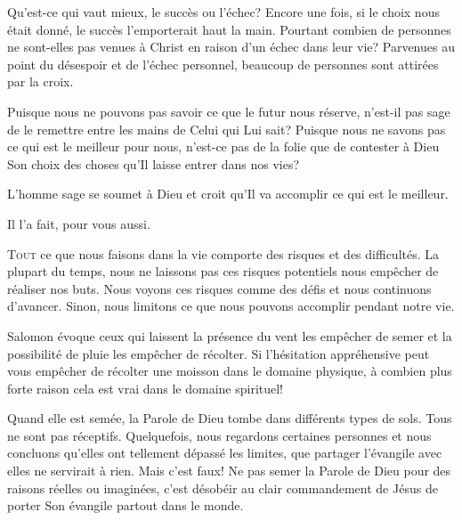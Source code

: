 Qu'est-ce qui vaut mieux, le succès ou l'échec?
 Encore une fois, si le choix nous était donné,
 le succès l'emporterait haut la main.
 Pourtant combien de personnes ne sont-elles pas venues à Christ
 en raison d'un échec dans leur vie?
 Parvenues au point du désespoir et de l'échec personnel,
 beaucoup de personnes sont attirées par la croix. 

Puisque nous ne pouvons pas savoir ce que le futur nous réserve,
 n'est-il pas sage de le remettre entre les mains de Celui qui Lui sait?
 Puisque nous ne savons pas ce qui est le meilleur pour nous,
 n'est-ce pas de la folie que de contester à Dieu Son choix des choses
 qu'Il laisse entrer dans nos vies? 

L'homme sage se soumet à Dieu et croit qu'Il va accomplir
 ce qui est le meilleur. 

Il l'a fait, pour vous aussi.

\dvrule






\lettrine{T}{out} ce que nous faisons dans la vie
 comporte des risques et des difficultés.
 La plupart du temps, nous ne laissons pas ces risques potentiels
 nous empêcher de réaliser nos buts.
 Nous voyons ces risques comme des défis et nous continuons d'avancer.
 Sinon, nous limitons ce que nous pouvons accomplir pendant notre vie. 

Salomon évoque ceux qui laissent la présence du vent les empêcher
 de semer et la possibilité de pluie les empêcher de récolter.
 Si l'hésitation appréhensive peut vous empêcher de récolter
 une moisson dans le domaine physique, à combien plus forte raison
 cela est vrai dans le domaine spirituel! 

Quand elle est semée, la Parole de Dieu tombe dans différents types de sols.
 Tous ne sont pas réceptifs.
 Quelquefois, nous regardons certaines personnes et nous concluons
 qu'elles ont tellement dépassé les limites, que partager l'évangile 
 avec elles ne servirait à rien. Mais c'est faux!
 Ne pas semer la Parole de Dieu pour des raisons réelles ou imaginées,
 c'est désobéir au clair commandement de Jésus de porter Son évangile 
 partout dans le monde. 

